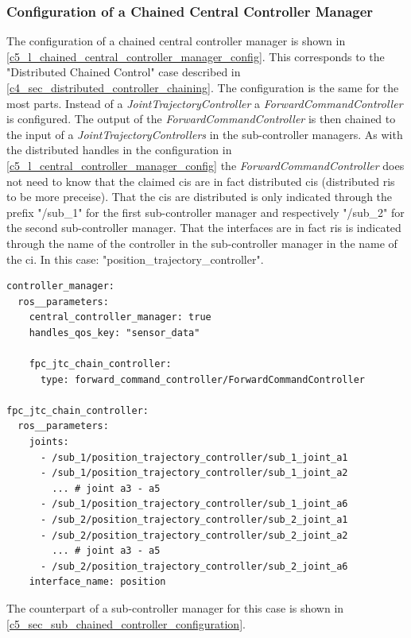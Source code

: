 \subsubsection{Configuration of a Chained Central Controller Manager}\label{c5_configuration_of_chained_central_controller_manager}
The configuration of a chained central controller manager is shown in \autoref{c5_l_chained_central_controller_manager_config}. This corresponds to the "Distributed Chained Control" case described in \autoref{c4_sec_distributed_controller_chaining}. The configuration is the same for the most parts. Instead of a \textit{JointTrajectoryController} a \textit{ForwardCommandController} is configured. The output of the \textit{ForwardCommandController} is then chained to the input of a \textit{JointTrajectoryControllers} in the sub-controller managers. As with the distributed \glspl{handle} in the configuration in \autoref{c5_l_central_controller_manager_config} the \textit{ForwardCommandController} does not need to know that the claimed \glspl{ci} are in fact distributed \glspl{ci} (distributed \glspl{ri} to be more preceise). That the \glspl{ci}
are distributed is only indicated through the prefix "/sub\_1"  for the first sub-controller manager and respectively "/sub\_2" for the second sub-controller manager. That the interfaces are in fact \glspl{ri} is indicated through the name of the controller in the sub-controller manager in the name of the \gls{ci}. In this case: "position\_trajectory\_controller". \newline
\lstset{language=yaml,basicstyle=\small}
\begin{lstlisting}[caption=Example configuration of a chained central controller manager.,label=c5_l_chained_central_controller_manager_config]
controller_manager:
  ros__parameters:
    central_controller_manager: true
    handles_qos_key: "sensor_data"

    fpc_jtc_chain_controller:
      type: forward_command_controller/ForwardCommandController

fpc_jtc_chain_controller:
  ros__parameters:
    joints:
      - /sub_1/position_trajectory_controller/sub_1_joint_a1
      - /sub_1/position_trajectory_controller/sub_1_joint_a2
        ... # joint a3 - a5
      - /sub_1/position_trajectory_controller/sub_1_joint_a6
      - /sub_2/position_trajectory_controller/sub_2_joint_a1
      - /sub_2/position_trajectory_controller/sub_2_joint_a2
        ... # joint a3 - a5
      - /sub_2/position_trajectory_controller/sub_2_joint_a6
    interface_name: position
\end{lstlisting}
The counterpart of a sub-controller manager for this case is shown in \autoref{c5_sec_sub_chained_controller_configuration}.
